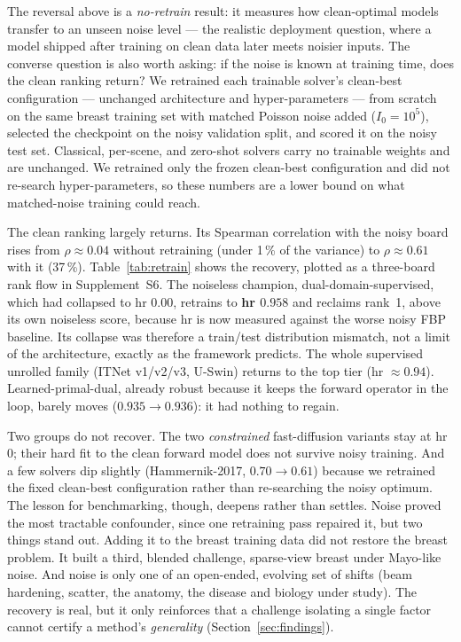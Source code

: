 \documentclass[AMA,twocolumn]{USG} %
\begin{document}
The reversal above is a \emph{no-retrain} result: it measures how clean-optimal models transfer to an unseen noise level --- the realistic deployment question, where a model shipped after training on clean data later meets noisier inputs. The converse question is also worth asking: if the noise is known at training time, does the clean ranking return? We retrained each trainable solver's clean-best configuration --- unchanged architecture and hyper-parameters --- from scratch on the same breast training set with matched Poisson noise added ($I_0=10^5$), selected the checkpoint on the noisy validation split, and scored it on the noisy test set. Classical, per-scene, and zero-shot solvers carry no trainable weights and are unchanged. We retrained only the frozen clean-best configuration and did not re-search hyper-parameters, so these numbers are a lower bound on what matched-noise training could reach.

The clean ranking largely returns. Its Spearman correlation with the noisy board rises from $\rho\approx0.04$ without retraining (under 1\,\% of the variance) to $\rho\approx0.61$ with it (37\,\%). Table~\ref{tab:retrain} shows the recovery, plotted as a three-board rank flow in Supplement~S6. The noiseless champion, dual-domain-supervised, which had collapsed to hr $0.00$, retrains to \textbf{hr $0.958$} and reclaims rank~1, above its own noiseless score, because hr is now measured against the worse noisy FBP baseline. Its collapse was therefore a train/test distribution mismatch, not a limit of the architecture, exactly as the framework predicts. The whole supervised unrolled family (ITNet v1/v2/v3, U-Swin) returns to the top tier (hr $\approx0.94$). Learned-primal-dual, already robust because it keeps the forward operator in the loop, barely moves ($0.935\!\to\!0.936$): it had nothing to regain.

Two groups do not recover. The two \emph{constrained} fast-diffusion variants stay at hr $0$; their hard fit to the clean forward model does not survive noisy training. And a few solvers dip slightly (Hammernik-2017, $0.70\!\to\!0.61$) because we retrained the fixed clean-best configuration rather than re-searching the noisy optimum. The lesson for benchmarking, though, deepens rather than settles. Noise proved the most tractable confounder, since one retraining pass repaired it, but two things stand out. Adding it to the breast training data did not restore the breast problem. It built a third, blended challenge, sparse-view breast under Mayo-like noise. And noise is only one of an open-ended, evolving set of shifts (beam hardening, scatter, the anatomy, the disease and biology under study). The recovery is real, but it only reinforces that a challenge isolating a single factor cannot certify a method's \emph{generality} (Section~\ref{sec:findings}).
\end{document}
